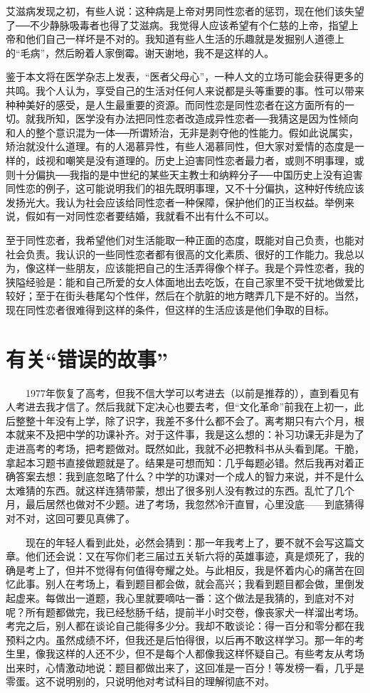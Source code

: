 艾滋病发现之初，有些人说：这种病是上帝对男同性恋者的惩罚，现在他们该失望了──不少静脉吸毒者也得了艾滋病。我觉得人应该希望有个仁慈的上帝，指望上帝和他们自己一样坏是不对的。我知道有些人生活的乐趣就是发掘别人道德上的“毛病”，然后盼着人家倒霉。谢天谢地，我不是这样的人。 

鉴于本文将在医学杂志上发表，“医者父母心”，一种人文的立场可能会获得更多的共鸣。我个人认为，享受自己的生活对任何人来说都是头等重要的事。性可以带来种种美好的感受，是人生最重要的资源。而同性恋是同性恋者在这方面所有的一切。就我所知，医学没有办法把同性恋者改造成异性恋者──我猜这是因为性倾向和人的整个意识混为一体──所谓矫治，无非是剥夺他的性能力。假如此说属实，矫治就没什么道理。有的人渴慕异性，有些人渴慕同性，但大家对爱情的态度是一样的，歧视和嘲笑是没有道理的。历史上迫害同性恋者最力者，或则不明事理，或则十分偏执──我指的是中世纪的某些天主教士和纳粹分子──中国历史上没有迫害同性恋的例子，这可能说明我们的祖先既明事理，又不十分偏执，这种好传统应该发扬光大。我认为社会应该给同性恋者一种保障，保护他们的正当权益。举例来说，假如有一对同性恋者要结婚，我就看不出有什么不可以。 

至于同性恋者，我希望他们对生活能取一种正面的态度，既能对自己负责，也能对社会负责。我认识的一些同性恋者都有很高的文化素质、很好的工作能力。我总以为，像这样一些朋友，应该能把自己的生活弄得像个样子。我是个异性恋者，我的狭隘经验是：能和自己所爱的女人体面地出去吃饭，在自己家里不受干扰地做爱比较好；至于在街头巷尾勾个性伴，然后在个肮脏的地方瞎弄几下是不好的。当然，现在同性恋者很难得到这样的条件，但这样的生活应该是他们争取的目标。

\chapter{有关“错误的故事”}

　　1977年恢复了高考，但我不信大学可以考进去（以前是推荐的），直到看见有人考进去我才信了。然后我就下定决心也要去考，但“文化革命”前我在上初一，此后整整十年没有上学，除了识字，我差不多什么都不会了。离考期只有六个月，根本就来不及把中学的功课补齐。对于这件事，我是这么想的：补习功课无非是为了走进高考的考场，把考题做对。既然如此，我就不必把教科书从头看到尾。干脆，拿起本习题书直接做题就是了。结果是可想而知：几乎每题必错。然后我再对着正确答案去想：我到底忽略了什么？中学的功课对一个成人的智力来说，并不是什么太难猜的东西。就这样连猜带蒙，想出了很多别人没有教过的东西。乱忙了几个月，最后居然也做对不少题。进了考场，我忽然冷汗直冒，心里没底——到底猜得对不对，这回可要见真佛了。 

　　现在的年轻人看到此处，必然会猜到：那一年我考上了，要不就不会写这篇文章。他们还会说：又在写你们老三届过五关斩六将的英雄事迹，真是烦死了，我的确是考上了，但并不觉得有何值得夸耀之处。与此相反，我是怀着内心的痛苦在回忆此事。别人在考场上，看到题目都会做，就会高兴；我看到题目都会做，里倒发起虚来。每做出一道题，我心里就要嘀咕一番：这个做法是我猜的，到底对不对呢？所有题都做完，我已经愁肠千结，提前半小时交卷，像丧家犬一样溜出考场。考完之后，别人都在谈论自己能得多少分。我却不敢谈论：得一百分和零分都在我预料之内。虽然成绩不坏，但我还是后怕得很，以后再不敢这样学习。那一年的考生里，像我这样的人还不少，但不是每个人都像我这样怀疑自己。有些考友从考场出来时，心情激动地说：题目都做出来了，这回准是一百分！等发榜一看，几乎是零蛋。这不说明别的，只说明他对考试科目的理解彻底不对。 

